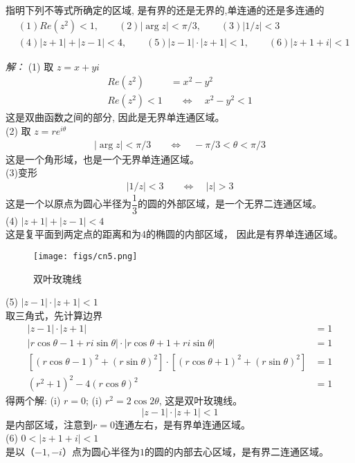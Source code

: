 \begin{example}
    指明下列不等式所确定的区域, 是有界的还是无界的,单连通的还是多连通的
    \[ \begin{aligned}
        & (1) Re(z^2) < 1, \qquad (2) |\arg z| < \pi/3, \qquad (3) |1/z| < 3 \\
        & (4) |z+1| +|z-1| <4, \qquad (5) |z-1|\cdot|z+1|<1 , \qquad (6) |z+ 1 +i| <1
    \end{aligned}\]
\end{example}
\emph{解：} (1) 取 $z=x+yi$
\[ \begin{aligned}
    Re(z^2) &= x^2 -y^2 \\
    Re(z^2) < 1 & \quad \Leftrightarrow  \quad  x^2 -y^2 < 1
\end{aligned}\]
这是双曲函数之间的部分, 因此是无界单连通区域。\\
(2) 取 $z=re^{i \theta}$
\[ \begin{aligned}
    |\arg z| < \pi/3 & \quad \Leftrightarrow  \quad  -\pi/3  <\theta < \pi/3 
\end{aligned}\]
这是一个角形域，也是一个无界单连通区域。\\
(3)变形
\[ \begin{aligned}
    |1/z| < 3  & \quad \Leftrightarrow  \quad  |z| > 3 
\end{aligned}\]
这是一个以原点为圆心半径为$\dfrac{1}{3}$的圆的外部区域，是一个无界二连通区域。\\
(4) $|z+1| +|z-1| <4$ \\
这是复平面到两定点的距离和为4的椭圆的内部区域， 因此是有界单连通区域。 \\
\begin{figure}[htbp]
    \centering
    \texttt{[image: figs/cn5.png]}
    \caption{双叶玫瑰线}
\end{figure}
(5) $|z-1|\cdot|z+1|<1$\\
取三角式，先计算边界 
\[ \begin{aligned}
    |z-1|\cdot|z+1| &=1 \\
    |r \cos \theta -1 + r i \sin \theta|\cdot|r \cos \theta +1 + r i \sin \theta| &=1 \\
    [(r \cos \theta -1)^2  + (r \sin \theta)^2 ] \cdot [(r \cos \theta +1)^2  + (r \sin \theta)^2 ] &=1 \\
    (r^2 +1)^2 -4(r \cos \theta)^2 &= 1 
\end{aligned}\]
得两个解: (i) $r=0$; (i) $r^2=2 \cos 2 \theta$, 这是双叶玫瑰线。 
\[|z-1|\cdot|z+1| <1 \]
是内部区域，注意到$r=0$连通左右，是有界单连通区域。\\
(6) $ 0<|z+ 1 +i| <1$ \\
是以（$-1,-i$）点为圆心半径为$1$的圆的内部去心区域，是有界二连通区域。


